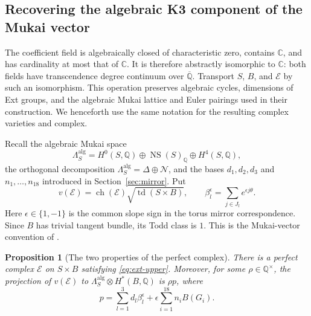 \documentclass[11pt]{article}
\numberwithin{equation}{section}
\newtheorem{proposition}[theorem]{Proposition}
\theoremstyle{definition}
\theoremstyle{remark}
\begin{document}
\subsection{Recovering the algebraic K3 component of the Mukai vector}

The coefficient field is algebraically closed of characteristic zero,
contains $\mathbb C$, and has cardinality at most that of $\mathbb C$.
It is therefore abstractly isomorphic to $\mathbb C$: both fields have
transcendence degree continuum over $\overline{\mathbb Q}$.
Transport $S$, $B$, and $\mathcal E$ by such an isomorphism.
This operation preserves algebraic cycles, dimensions of Ext groups,
and the algebraic Mukai lattice and Euler pairings used in their
construction.  We henceforth use the same notation for the resulting
complex varieties and complex.

Recall the algebraic Mukai space
\[
 \Lambda_S^{\mathrm{alg}}
       =H^0(S,\mathbb Q)\oplus\operatorname{NS}(S)_\mathbb Q\oplus H^4(S,\mathbb Q),
\]
the orthogonal decomposition
$\Lambda_S^{\mathrm{alg}}=\Delta\oplus\mathcal N$, and the bases
$d_1,d_2,d_3$ and $n_1,\ldots,n_{18}$ introduced in
Section~\ref{sec:mirror}.  Put
\[
 v(\mathcal E)=\operatorname{ch}(\mathcal E)\sqrt{\operatorname{td}(S\times B)},
 \qquad
 \beta_l^{\epsilon}=\sum_{j\in J_l}e^{\epsilon j\theta}.
\]
Here $\epsilon\in\{1,-1\}$ is the common slope sign in the torus
mirror correspondence.  Since $B$ has trivial tangent bundle, its
Todd class is $1$.  This is the Mukai-vector convention of
\cite[Definition~2.1 and Proposition~2.2]{History:Mukai}.

\begin{proposition}[The two properties of the perfect complex]
\label{prop:perfect-complex}
There is a perfect complex $\mathcal E$ on $S\times B$ satisfying
\eqref{eq:ext-upper}.  Moreover, for some $\rho\in\mathbb Q^\times$, the
projection of $v(\mathcal E)$ to
$\Lambda_S^{\mathrm{alg}}\otimes H^*(B,\mathbb Q)$ is $\rho p$, where
\begin{equation}
            p=\sum_{l=1}^3d_l\beta_l^{\epsilon}
                   +\epsilon\sum_{i=1}^{18}n_i B(G_i).
 \label{eq:algebraic-mukai-component}
\end{equation}
\end{proposition}
\end{document}
